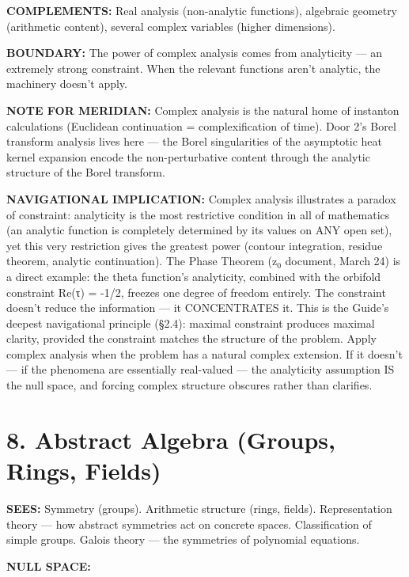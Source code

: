 \textbf{COMPLEMENTS:} Real analysis (non-analytic functions), algebraic geometry (arithmetic content), several complex variables (higher dimensions).


\textbf{BOUNDARY:} The power of complex analysis comes from analyticity — an extremely strong constraint. When the relevant functions aren't analytic, the machinery doesn't apply.


\textbf{NOTE FOR MERIDIAN:} Complex analysis is the natural home of instanton calculations (Euclidean continuation = complexification of time). Door 2's Borel transform analysis lives here — the Borel singularities of the asymptotic heat kernel expansion encode the non-perturbative content through the analytic structure of the Borel transform.


\textbf{NAVIGATIONAL IMPLICATION:} Complex analysis illustrates a paradox of constraint: analyticity is the most restrictive condition in all of mathematics (an analytic function is completely determined by its values on ANY open set), yet this very restriction gives the greatest power (contour integration, residue theorem, analytic continuation). The Phase Theorem (z$_0$ document, March 24) is a direct example: the theta function's analyticity, combined with the orbifold constraint Re(τ) = -1/2, freezes one degree of freedom entirely. The constraint doesn't reduce the information — it CONCENTRATES it. This is the Guide's deepest navigational principle (§2.4): maximal constraint produces maximal clarity, provided the constraint matches the structure of the problem. Apply complex analysis when the problem has a natural complex extension. If it doesn't — if the phenomena are essentially real-valued — the analyticity assumption IS the null space, and forcing complex structure obscures rather than clarifies.


\bigskip\noindent\makebox[\textwidth]{\color{rulegray}\rule{5cm}{0.3pt}}\bigskip


\section*{8. Abstract Algebra (Groups, Rings, Fields)}


\textbf{SEES:} Symmetry (groups). Arithmetic structure (rings, fields). Representation theory — how abstract symmetries act on concrete spaces. Classification of simple groups. Galois theory — the symmetries of polynomial equations.


\textbf{NULL SPACE:}

